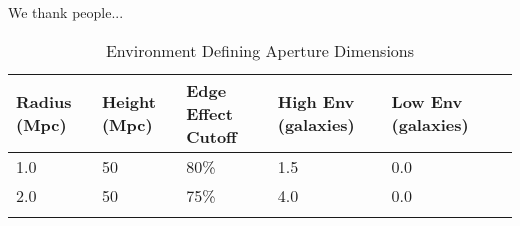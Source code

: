 \documentclass{emulateapj}
\begin{document}


We thank people...
%
%


\appendix
\begin{table*} %
  \caption{Environment Defining Aperture Dimensions}
  \label{tab:aperture}
  \begin{center}
    \leavevmode
    \begin{tabular}{llllll} \hline \hline              
  Radius (Mpc)          &Height (Mpc)      & Edge Effect Cutoff &High Env (galaxies) &Low Env (galaxies) \\ \hline 
  1.0 &50 & 80\% & 1.5 & 0.0          \\
  2.0 &50 & 75\% & 4.0 & 0.0          \\ \hline
  \multicolumn{5}{l}{}                                             \\       
    \end{tabular}
  \end{center}
\end{table*}
\end{document}

